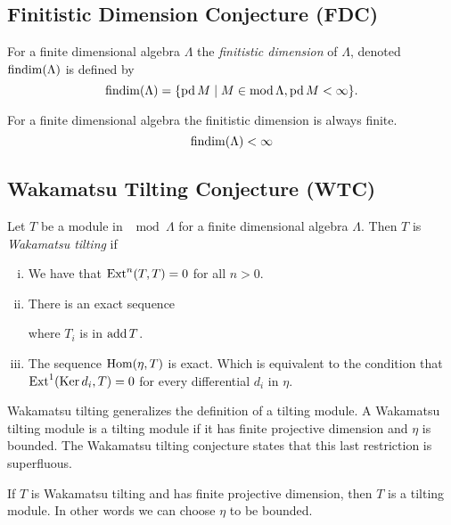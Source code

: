 
\subsection*{Finitistic Dimension Conjecture (FDC)}
\begin{defn}
	For a finite dimensional algebra $\Lambda$ the \emph{finitistic dimension} of $\Lambda$, denoted $\operatorname{findim}(\Lambda)$ is defined by
	$$\operatorname{findim}(\Lambda) = \{\operatorname{pd} M \mid M \in \operatorname{mod}\Lambda, \operatorname{pd} M < \infty\}.$$
\end{defn}

\begin{conj}
	For a finite dimensional algebra the finitistic dimension is always finite.
	$$\operatorname{findim}(\Lambda) < \infty$$
\end{conj}

\subsection*{Wakamatsu Tilting Conjecture (WTC)}
\begin{defn}
	Let $T$ be a module in $\mod\Lambda$ for a finite dimensional algebra $\Lambda$. Then $T$ is \emph{Wakamatsu tilting} if
	\begin{enumerate}[i)]
		\item We have that $\operatorname{Ext}^n(T,T)=0$ for all $n >0$.
		\item There is an exact sequence 
		\begin{center}
		\end{center}
		where $T_i$ is in $\operatorname{add} T$.
		\item The sequence $\operatorname{Hom}(\eta, T)$ is exact. Which is equivalent to the condition that $\operatorname{Ext}^1(\operatorname{Ker} d_i, T)=0$ for every differential $d_i$ in $\eta$.
	\end{enumerate}
\end{defn}

Wakamatsu tilting generalizes the definition of a tilting module. A Wakamatsu tilting module is a tilting module if it has finite projective dimension and $\eta$ is bounded. The Wakamatsu tilting conjecture states that this last restriction is superfluous.

\begin{conj} 
	If $T$ is Wakamatsu tilting and has finite projective dimension, then $T$ is a tilting module. In other words we can choose $\eta$ to be bounded.
\end{conj}


